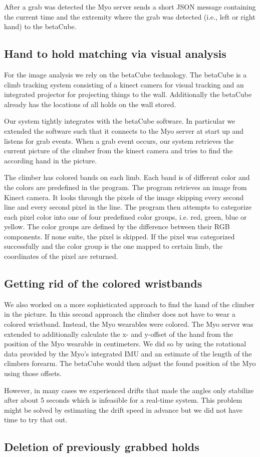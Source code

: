 After a grab was detected the Myo server sends a short JSON message containing the current time and the extremity where the grab was detected (i.e., left or right hand) to the betaCube.

\subsection{Hand to hold matching via visual analysis}
For the image analysis we rely on the betaCube technology.
The betaCube is a climb tracking system consisting of a kinect camera for visual tracking and an integrated projector for projecting things to the wall.
Additionally the betaCube already has the locations of all holds on the wall stored.

Our system tightly integrates with the betaCube software.
In particular we extended the software such that it connects to the Myo server at start up and listens for grab events.
When a grab event occurs, our system retrieves the current picture of the climber from the kinect camera and tries to find the according hand in the picture.

The climber has colored bands on each limb.
Each band is of different color and the colors are predefined in the program.
The program retrieves an image from Kinect camera.
It looks through the pixels of the image skipping every second line and every second pixel in the line.
The program then attempts to categorize each pixel color into one of four predefined color groups, i.e. red, green, blue or yellow.
The color groups are defined by the difference between their RGB components.
If none suite, the pixel is skipped.
If the pixel was categorized successfully and the color group is the one mapped to certain limb, the coordinates of the pixel are returned.

\subsection{Getting rid of the colored wristbands}
We also worked on a more sophisticated approach to find the hand of the climber in the picture.
In this second approach the climber does not have to wear a colored wristband.
Instead, the Myo wearables were colored.
The Myo server was extended to additionally calculate the x- and y-offset of the hand from the position of the Myo wearable in centimeters.
We did so by using the rotational data provided by the Myo's integrated IMU and an estimate of the length of the climbers forearm.
The betaCube would then adjust the found position of the Myo using those offsets.

However, in many cases we experienced drifts that made the angles only stabilize after about 5 seconds which is infeasible for a real-time system.
This problem might be solved by estimating the drift speed in advance but we did not have time to try that out.

\subsection{Deletion of previously grabbed holds}

